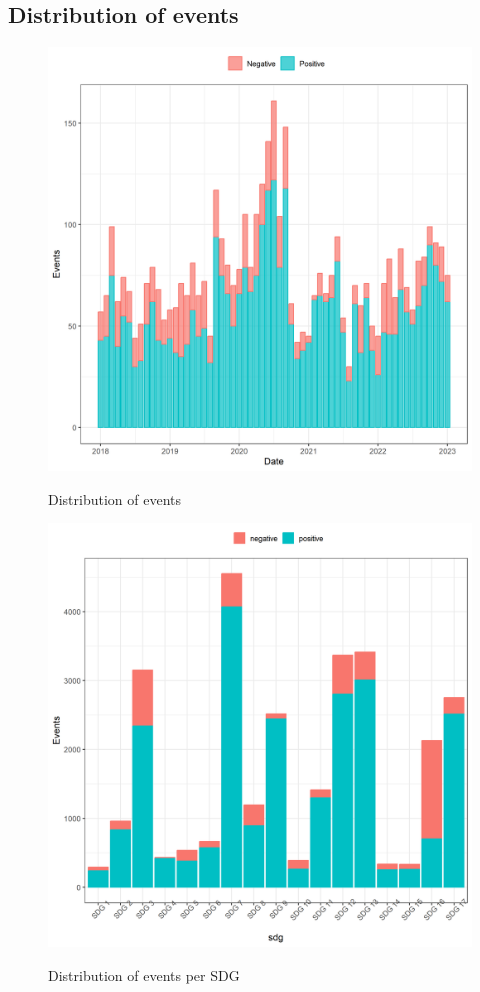 

\subsection{Distribution of events}
\begin{figure} [H]
    \centering
    \caption{Distribution of events}
    \includegraphics[scale=0.5]{Projekt/1.Figures analysis/event_distribution.png}
    \label{fig:event_distribution}
\end{figure}

\begin{figure} [H]
    \centering
    \caption{Distribution of events per SDG}
    \includegraphics[scale=0.5]{Projekt/1.Figures analysis/event_distribution_SDG.png}
    \label{fig:event_distribution_SDG}
\end{figure}

